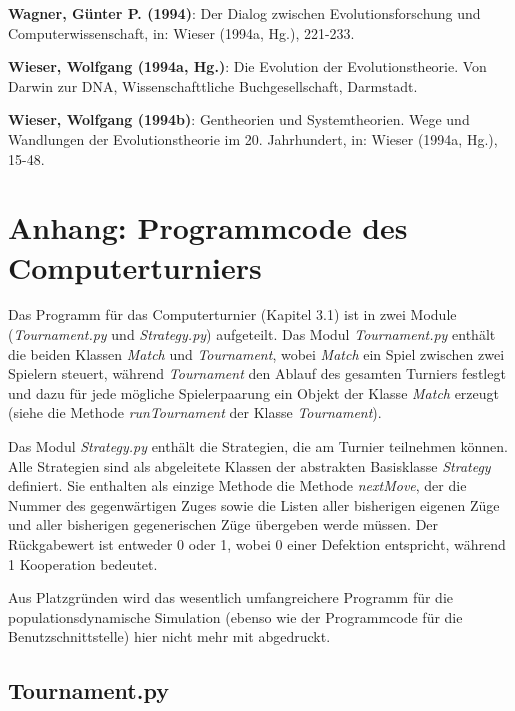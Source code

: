 \documentclass[12pt,a4paper,ngerman]{article}
\begin{document}
{\bf Wagner, Günter P. (1994)}: Der Dialog zwischen Evolutionsforschung und Computerwissenschaft, in: Wieser (1994a, Hg.), 221-233.

{\bf Wieser, Wolfgang (1994a, Hg.)}: Die Evolution der
Evolutionstheorie. Von Darwin zur DNA, Wissenschafttliche
Buchgesellschaft, Darmstadt.

{\bf Wieser, Wolfgang (1994b)}: Gentheorien und Systemtheorien. Wege
und Wandlungen der Evolutionstheorie im 20. Jahrhundert, in: Wieser
(1994a, Hg.), 15-48.

\newpage

\section{Anhang: Programmcode des Computerturniers}

Das Programm für das Computerturnier (Kapitel 3.1) ist in zwei Module ({\em Tournament.py} und {\em Strategy.py}) aufgeteilt. Das Modul {\em Tournament.py}
enthält die beiden Klassen {\em Match} und  {\em Tournament}, wobei {\em Match} ein Spiel zwischen zwei Spielern steuert, während {\em Tournament} den Ablauf des gesamten Turniers festlegt und dazu für jede mögliche Spielerpaarung ein Objekt der Klasse {\em Match} erzeugt (siehe die Methode {\em runTournament} der Klasse {\em Tournament}). 

Das Modul {\em Strategy.py} enthält die Strategien, die am Turnier teilnehmen können. Alle Strategien sind als abgeleitete Klassen der abstrakten Basisklasse {\em Strategy} definiert. Sie enthalten als einzige Methode die Methode {\em nextMove}, der die Nummer des gegenwärtigen Zuges sowie die Listen aller bisherigen eigenen Züge und aller bisherigen gegenerischen Züge übergeben werde müssen. Der Rückgabewert ist entweder 0 oder 1, wobei 0 einer Defektion entspricht, während 1 Kooperation bedeutet.

Aus Platzgründen wird das wesentlich umfangreichere Programm für die populationsdynamische Simulation (ebenso wie der Programmcode für die Benutzschnittstelle) hier nicht mehr mit abgedruckt.


\subsection{Tournament.py}
\end{document}
